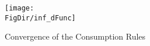 \hypertarget{inf_dFunc}{}
\begin{figure}[tbp]
\centerline{\texttt{[image: \\FigDir/inf\_dFunc]}}
\caption{Convergence of the Consumption Rules}
\label{fig:inf_dFunc}
\end{figure}